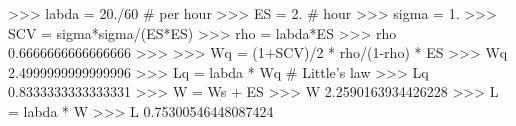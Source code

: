 
>>> labda = 20./60 # per hour
>>> ES = 2. # hour
>>> sigma = 1.
>>> SCV = sigma*sigma/(ES*ES)
>>> rho = labda*ES
>>> rho
0.6666666666666666
>>>
>>> Wq = (1+SCV)/2 * rho/(1-rho) * ES
>>> Wq
2.4999999999999996
>>> Lq = labda * Wq # Little's law
>>> Lq
0.8333333333333331
>>> W = Ws + ES
>>> W
2.2590163934426228
>>> L = labda * W
>>> L
0.75300546448087424

